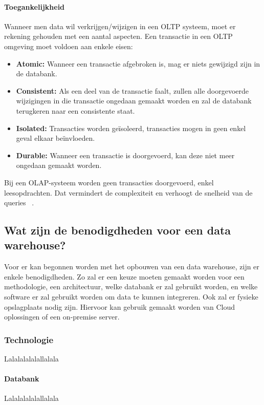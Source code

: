 \paragraph{Toegankelijkheid}
Wanneer men data wil verkrijgen/wijzigen in een OLTP systeem, moet er rekening gehouden met een aantal aspecten. Een transactie in een OLTP omgeving moet voldoen aan enkele eisen:
\begin{itemize}
	\item \textbf{Atomic:} Wanneer een transactie afgebroken is, mag er niets gewijzigd zijn in de databank.
	\item \textbf{Consistent:} Als een deel van de transactie faalt, zullen alle doorgevoerde wijzigingen in die transactie ongedaan gemaakt worden en zal de databank terugkeren naar een consistente staat.
	\item \textbf{Isolated:} Transacties worden geïsoleerd, transacties mogen in geen enkel geval elkaar beïnvloeden.
	\item \textbf{Durable:} Wanneer een transactie is doorgevoerd, kan deze niet meer ongedaan gemaakt worden.
\end{itemize}  

Bij een OLAP-systeem worden geen transacties doorgevoerd, enkel leesopdrachten. Dat vermindert de complexiteit en verhoogt de snelheid van de queries ~\autocite{Satyanarayana2010}. 

\subsection{Wat zijn de benodigdheden voor een data warehouse?}
Voor er kan begonnen worden met het opbouwen van een data warehouse, zijn er enkele benodigdheden. Zo zal er een keuze moeten gemaakt worden voor een methodologie, een architectuur, welke databank er zal gebruikt worden, en welke software er zal gebruikt worden om data te kunnen integreren. Ook zal er fysieke opslagplaats nodig zijn. Hiervoor kan gebruik gemaakt worden van Cloud oplossingen of een on-premise server.

\subsubsection{Technologie}
Lalalalalalallalala

\paragraph{Databank}
Lalalalalalallalala


